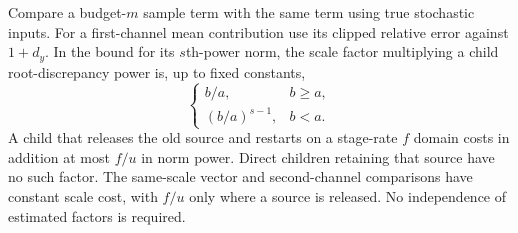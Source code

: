 \begin{lemma}\label{lem:est-mean-comparison}
Compare a budget-$m$ sample term with the same term using true stochastic
inputs.  For a first-channel mean contribution use its clipped relative
error against $1+d_y$.  In the bound for its $s$th-power norm, the scale
factor multiplying a child root-discrepancy power is, up to fixed constants,
\[
 \begin{cases}
 b/a,&b\ge a,\\
 (b/a)^{s-1},&b<a.
 \end{cases}
\]
A child that releases the old source and restarts on a stage-rate $f$
domain costs in addition at most $f/u$ in norm power.  Direct children
retaining that source have no such factor.  The same-scale vector and
second-channel comparisons have constant scale cost, with $f/u$ only
where a source is released.  No independence of estimated factors is
required.
\end{lemma}
